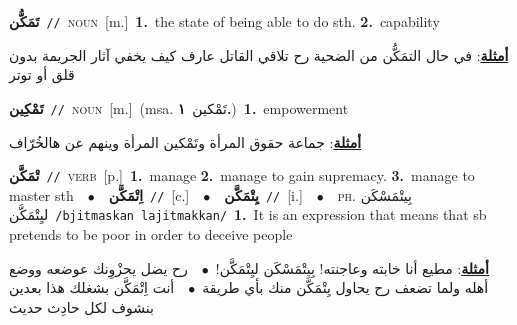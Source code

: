 \documentclass[10pt,a4paper,twoside]{article} %
\begin{document}
\begin{multicols}{2}
{\setlength\topsep{0pt}\textbf{\foreignlanguage{arabic}{تَمَكُّن}}\ {\color{gray}\texttt{//}\color{black}}\ \textsc{noun}\ [m.]\ \textbf{1.}~the state of being able to do sth.  \textbf{2.}~capability\  \begin{flushright}\color{gray}\foreignlanguage{arabic}{\textbf{\underline{\foreignlanguage{arabic}{أمثلة}}}: في حال التمَكُّن من الضحية رح تلاقي القاتل عارف كيف يخفي آثار الجريمة بدون قلق أو توتر}\end{flushright}\color{black}} \vspace{2mm}

{\setlength\topsep{0pt}\textbf{\foreignlanguage{arabic}{تَمْكِين}}\ {\color{gray}\texttt{//}\color{black}}\ \textsc{noun}\ [m.]\ \color{gray}(msa. \foreignlanguage{arabic}{تَمْكين}~\foreignlanguage{arabic}{\textbf{١.}})\color{black}\ \textbf{1.}~empowerment\  \begin{flushright}\color{gray}\foreignlanguage{arabic}{\textbf{\underline{\foreignlanguage{arabic}{أمثلة}}}: جماعة حقوق المرأة وتَمْكين المرأة وينهم عن هالخُرّاف}\end{flushright}\color{black}} \vspace{2mm}

{\setlength\topsep{0pt}\textbf{\foreignlanguage{arabic}{تْمَكَّن}}\ {\color{gray}\texttt{//}\color{black}}\ \textsc{verb}\ [p.]\ \textbf{1.}~manage  \textbf{2.}~manage to gain supremacy.  \textbf{3.}~manage to master sth\ \ $\bullet$\ \ \setlength\topsep{0pt}\textbf{\foreignlanguage{arabic}{اِتْمَكَّن}}\ {\color{gray}\texttt{//}\color{black}}\ [c.]\ \ $\bullet$\ \ \setlength\topsep{0pt}\textbf{\foreignlanguage{arabic}{يِتْمَكَّن}}\ {\color{gray}\texttt{//}\color{black}}\ [i.]\ \ $\bullet$\ \ \textsc{ph.} \color{gray} \foreignlanguage{arabic}{بِيتْمَسْكَن ليِتْمَكَّن}\color{black}\ {\color{gray}\texttt{/{\sffamily bjitmaskan lajitmakkan}/}\color{black}}\ \textbf{1.}~It is an expression that means that sb pretends to be poor in order to deceive people\  \begin{flushright}\color{gray}\foreignlanguage{arabic}{\textbf{\underline{\foreignlanguage{arabic}{أمثلة}}}: مطيع أنا خابته وعاجنته! بِيتْمَسْكَن ليِتْمَكَّن!\ $\bullet$\ \  رح يضل يحزْوِنك عوضعه ووضع أهله ولما تضعف رح يحاول يِتْمَكَّن منك بأي طريقة\ $\bullet$\ \  أنت اِتْمَكَّن بشغلك هذا بعدين بنشوف لكل حادِث حديث}\end{flushright}\color{black}} \vspace{2mm}


\end{multicols}
\end{document}
